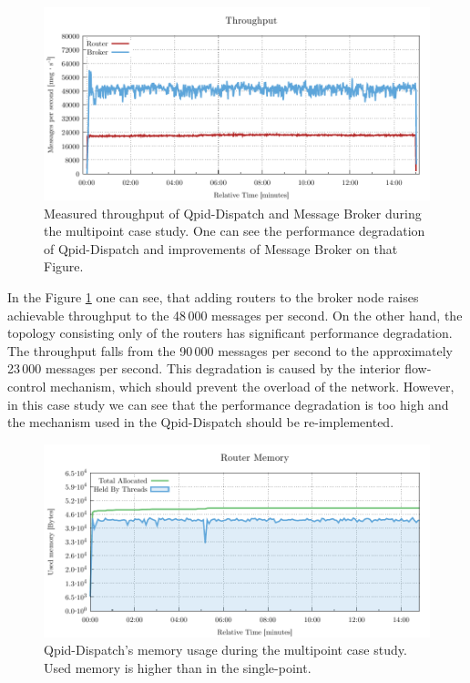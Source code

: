 \begin{figure}[H]
	\centering
	\includegraphics[width=1\linewidth]{obrazky-figures/charts/multipoint-throughput.pdf}
	\caption{Measured throughput of Qpid-Dispatch and Message Broker during the multipoint case study. One can see the performance degradation of Qpid-Dispatch and improvements of Message Broker on that Figure.}
	\label{fig:rate-multipoint-router}
\end{figure}

In the Figure \ref{fig:rate-multipoint-router} one can see, that adding routers to the broker node raises achievable throughput to the 48\,000 messages per second. On the other hand, the topology consisting only of the routers has significant performance degradation. The throughput falls from the 90\,000 messages per second to the approximately 23\,000 messages per second. This degradation is caused by the interior flow-control mechanism, which should prevent the overload of the network. However, in this case study we can see that the performance degradation is too high and the mechanism used in the Qpid-Dispatch should be re-implemented.


\begin{figure}[H]
	\centering
	\includegraphics[width=1\linewidth]{obrazky-figures/charts/multipoint-router-only-throughput-memory.pdf}
	\caption{Qpid-Dispatch's memory usage during the multipoint case study. Used memory is higher than in the single-point.}
	\label{fig:router-multipoint-memory}
\end{figure}

